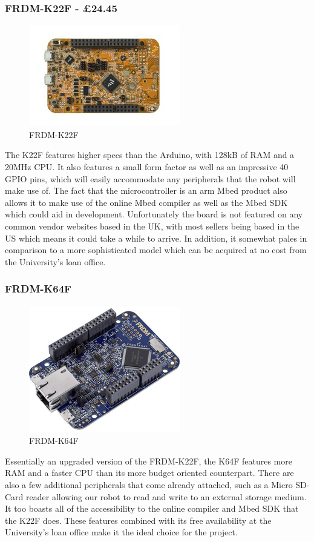 					\subsubsection{FRDM-K22F - \pounds{24.45}}
					\begin{figure}[h]
						\centering
						\includegraphics[width=.3\linewidth]{ANALYSIS/k22f.png}
						\caption{FRDM-K22F}
						\label{fig:k22f}
					\end{figure}
					The K22F features higher specs than the Arduino, with 128kB of RAM and a 20MHz CPU. It also features a small form factor as well as an impressive 40 GPIO pins, which will easily accommodate any peripherals that the robot will make use of. The fact that the microcontroller is an arm Mbed product also allows it to make use of the online Mbed compiler as well as the Mbed SDK which could aid in development. Unfortunately the board is not featured on any common vendor websites based in the UK, with most sellers being based in the US which means it could take a while to arrive. In addition, it somewhat pales in comparison to a more sophisticated model which can be acquired at no cost from the University's loan office.
					
					\subsubsection{FRDM-K64F}
					\begin{figure}[h]
						\centering
						\includegraphics[width=.3\linewidth]{ANALYSIS/k64f.png}
						\caption{FRDM-K64F}
						\label{fig:k64f}
					\end{figure}
					Essentially an upgraded version of the FRDM-K22F, the K64F features more RAM and a faster CPU than its more budget oriented counterpart. There are also a few additional peripherals that come already attached, such as a Micro SD-Card reader allowing our robot to read and write to an external storage medium. It too boasts all of the accessibility to the online compiler and Mbed SDK that the K22F does. These features combined with its free availability at the University's loan office make it the ideal choice for the project.
			
